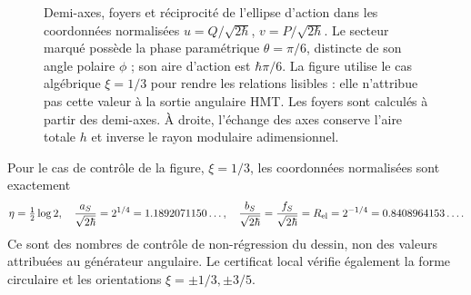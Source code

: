 \begin{figure}[htbp]
\endgroup

 \caption{Demi-axes, foyers et réciprocité de l'ellipse d'action dans les
 coordonnées normalisées \(u=Q/\sqrt{2\hbar}\),
 \(v=P/\sqrt{2\hbar}\). Le secteur marqué possède la phase paramétrique
 \(\theta=\pi/6\), distincte de son angle polaire \(\phi\) ; son aire
 d'action est \(\hbar\pi/6\). La figure utilise le cas algébrique
 \(\xi=1/3\) pour rendre les relations lisibles : elle n'attribue pas cette valeur
 à la sortie angulaire HMT. Les foyers sont calculés à partir des demi-axes.
 À droite, l'échange des axes conserve l'aire totale \(h\)
 et inverse le rayon modulaire adimensionnel.}
 \label{fig:ii-elipse-calculada}
\end{figure}

Pour le cas de contrôle de la figure, \(\xi=1/3\), les coordonnées
normalisées sont exactement
\[
 \eta=\tfrac12\log2,\quad
 \frac{a_S}{\sqrt{2\hbar}}=2^{1/4}=1.1892071150\ldots,\quad
 \frac{b_S}{\sqrt{2\hbar}}=
 \frac{f_S}{\sqrt{2\hbar}}=R_{\rm el}=2^{-1/4}=0.8408964153\ldots.
\]
Ce sont des nombres de contrôle de non-régression du dessin, non des valeurs attribuées au générateur
angulaire. Le certificat local vérifie également la forme circulaire et les
orientations \(\xi=\pm1/3,\pm3/5\).

